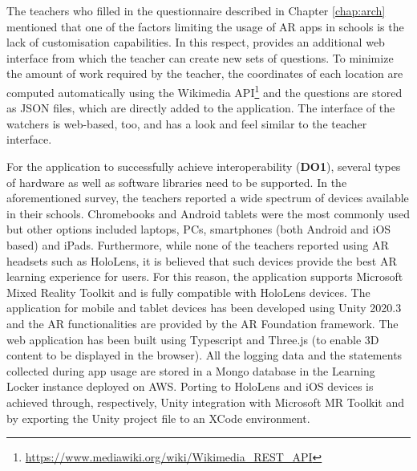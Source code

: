 The teachers who filled in the questionnaire described in Chapter \ref{chap:arch} mentioned that one of the factors limiting the usage of AR apps in schools is the lack of customisation capabilities.
In this respect, \appname{} provides an additional web interface from which the teacher can create new sets of questions.
To minimize the amount of work required by the teacher, the coordinates of each location are computed automatically using the Wikimedia API\footnote{\url{https://www.mediawiki.org/wiki/Wikimedia_REST_API}} and the questions are stored as JSON files, which are directly added to the application.
The interface of the watchers is web-based, too, and has a look and feel similar to the teacher interface.

For the application to successfully achieve interoperability (\textbf{DO1}), several types of hardware as well as software libraries need to be supported.
In the aforementioned survey, the teachers reported a wide spectrum of devices available in their schools. Chromebooks and Android tablets were the most commonly used but other options included laptops, PCs, smartphones (both Android and iOS based) and iPads.
Furthermore, while none of the teachers reported using AR headsets such as HoloLens, it is believed that such devices provide the best AR learning experience for users. For this reason, the application supports Microsoft Mixed Reality Toolkit and is fully compatible with HoloLens devices.
The application for mobile and tablet devices has been developed using Unity 2020.3 and the AR functionalities are provided by the AR Foundation framework.
The web application has been built using Typescript and Three.js (to enable 3D content to be displayed in the browser). All the logging data and the statements collected during app usage are stored in a Mongo database in the Learning Locker instance deployed on AWS.
Porting to HoloLens and iOS devices is achieved through, respectively,  Unity integration with Microsoft MR Toolkit and by exporting the Unity project file to an XCode environment.

